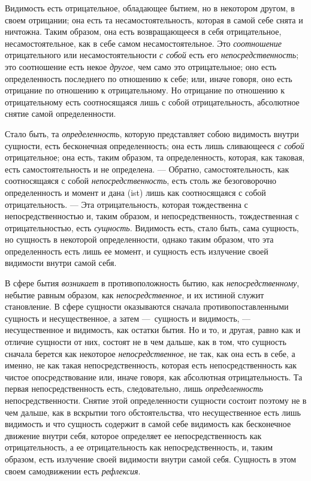 Видимость есть отрицательное, обладающее бытием, но в некотором другом, в
своем отрицании; она есть та несамостоятельность, которая в самой себе
снята и ничтожна. Таким образом, она есть возвращающееся в себя
отрицательное, несамостоятельное, как в себе самом несамостоятельное. Это
{\em соотношение} отрицательного или
несамостоятельности {\em с собой} есть его
{\em непосредственность}; это соотношение есть некое
{\em другое}, чем само это отрицательное; оно есть
определенность последнего по отношению к себе; или, иначе говоря, оно есть
отрицание по отношению к отрицательному. Но отрицание по отношению к
отрицательному есть соотносящаяся лишь с собой отрицательность, абсолютное
снятие самой определенности.

Стало быть, та {\em определенность}, которую
представляет собою видимость внутри сущности, есть бесконечная
определенность; она есть лишь сливающееся {\em с собой}
отрицательное; она есть, таким образом, та определенность, которая, как
таковая, есть самостоятельность и не определена. — Обратно,
самостоятельность, как соотносящаяся с собой{\em 
непосредственность}, есть столь же безоговорочно определенность и момент и
дана (ist) лишь как соотносящаяся с собой отрицательность. — Эта
отрицательность, которая тождественна с непосредственностью и, таким
образом, и непосредственность, тождественная с отрицательностью, есть
{\em сущность}. Видимость есть, стало быть, сама
сущность, но сущность в некоторой определенности, однако таким образом, что
эта определенность есть лишь ее момент, и сущность есть излучение своей
видимости внутри самой себя.

В сфере бытия {\em возникает} в противоположность бытию,
как {\em непосредственному}, небытие равным образом,
как {\em непосредственное}, и их истиной служит
становление. В сфере сущности оказываются сначала противопоставленными
сущность и несущественное, а затем —~сущность и видимость, — несущественное
и видимость, как остатки бытия. Но и то, и другая, равно как и отличие
сущности от них, состоят не в чем дальше, как в том, что сущность сначала
берется как некоторое {\em непосредственное}, не так,
как она есть в себе, а именно, не как такая непосредственность, которая
есть непосредственность как чистое опосредствование или, иначе говоря, как
абсолютная отрицательность. Та первая непосредственность есть,
следовательно, лишь {\em определенность}
непосредственности. Снятие этой определенности сущности состоит поэтому не
в чем дальше, как в вскрытии того обстоятельства, что несущественное есть
лишь видимость и что сущность содержит в самой себе видимость как
бесконечное движение внутри себя, которое определяет ее непосредственность
как отрицательность, а ее отрицательность как непосредственность, и, таким
образом, есть излучение своей видимости внутри самой себя. Сущность в этом
своем самодвижении есть {\em рефлексия}.

